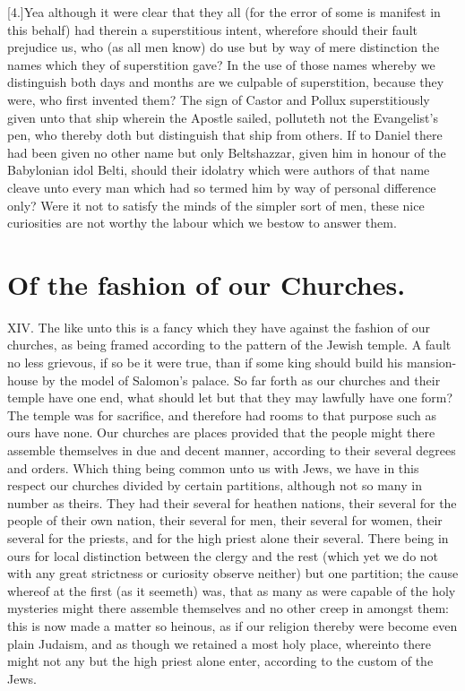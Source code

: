 [4.]Yea although it were clear that they all (for the error of some is manifest in this behalf) had therein a superstitious intent, wherefore should their fault prejudice us, who (as all men know) do use but by way of mere distinction the names which they of superstition gave? In the use of those names whereby we distinguish both days and months are we culpable of superstition, because they were, who first invented them? The sign of Castor and Pollux superstitiously given unto that ship wherein the Apostle sailed, polluteth not the Evangelist’s pen, who thereby doth but distinguish that ship from others. If to Daniel there had been given no other name but only Beltshazzar, given him in honour of the Babylonian idol Belti, should their idolatry which were authors of that name cleave unto every man which had so termed him by way of personal difference only? Were it not to satisfy the minds of the simpler sort of men, these nice curiosities are not worthy the labour which we bestow to answer them.


\section*{Of the fashion of our Churches.}
XIV. The like unto this is a fancy which they have against the fashion of our churches, as being framed according to the pattern of the Jewish temple. A fault no less grievous, if so be it were true, than if some king should build his mansion-house by the model of Salomon’s palace. So far forth as our churches and their temple have one end, what should let but that they may lawfully have one form? The temple was for sacrifice, and therefore had rooms to that purpose such as ours have none. Our churches are places provided that the people might there assemble themselves in due and decent manner, according to their several degrees and orders. Which thing being common unto us with Jews,  we have in this respect our churches divided by certain partitions, although not so many in number as theirs.
 They had their several for heathen nations, their several for the people of their own nation, their several for men, their several for women, their several for the priests, and for the high priest alone their several. There being in ours for local distinction between the clergy and the rest (which yet we do not with any great strictness or curiosity observe neither) but one partition; the cause whereof at the first (as it seemeth) was, that as many as were capable of the holy mysteries might there assemble themselves and no other creep in amongst them: this is now made a matter so heinous, as if our religion thereby were become even plain Judaism, and as though we retained a most holy place, whereinto there might not any but the high priest alone enter, according to the custom of the Jews.


